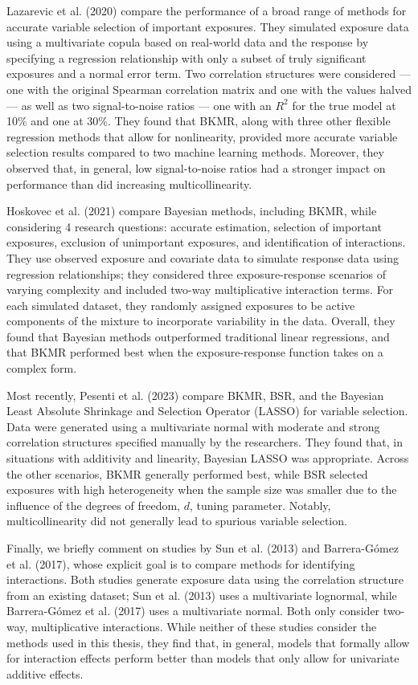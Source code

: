 \documentclass[12pt, twoside]{amherstthesis}
\begin{document}
Lazarevic et al. (2020) compare the performance of a broad range of methods for accurate variable selection of important exposures. They simulated exposure data using a multivariate copula based on real-world data and the response by specifying a regression relationship with only a subset of truly significant exposures and a normal error term. Two correlation structures were considered --- one with the original Spearman correlation matrix and one with the values halved --- as well as two signal-to-noise ratios --- one with an \(R^2\) for the true model at 10\% and one at 30\%. They found that BKMR, along with three other flexible regression methods that allow for nonlinearity, provided more accurate variable selection results compared to two machine learning methods. Moreover, they observed that, in general, low signal-to-noise ratios had a stronger impact on performance than did increasing multicollinearity.

Hoskovec et al. (2021) compare Bayesian methods, including BKMR, while considering 4 research questions: accurate estimation, selection of important exposures, exclusion of unimportant exposures, and identification of interactions. They use observed exposure and covariate data to simulate response data using regression relationships; they considered three exposure-response scenarios of varying complexity and included two-way multiplicative interaction terms. For each simulated dataset, they randomly assigned exposures to be active components of the mixture to incorporate variability in the data. Overall, they found that Bayesian methods outperformed traditional linear regressions, and that BKMR performed best when the exposure-response function takes on a complex form.

Most recently, Pesenti et al. (2023) compare BKMR, BSR, and the Bayesian Least Absolute Shrinkage and Selection Operator (LASSO) for variable selection. Data were generated using a multivariate normal with moderate and strong correlation structures specified manually by the researchers. They found that, in situations with additivity and linearity, Bayesian LASSO was appropriate. Across the other scenarios, BKMR generally performed best, while BSR selected exposures with high heterogeneity when the sample size was smaller due to the influence of the degrees of freedom, \(d\), tuning parameter. Notably, multicollinearity did not generally lead to spurious variable selection.

Finally, we briefly comment on studies by Sun et al. (2013) and Barrera-Gómez et al. (2017), whose explicit goal is to compare methods for identifying interactions. Both studies generate exposure data using the correlation structure from an existing dataset; Sun et al. (2013) uses a multivariate lognormal, while Barrera-Gómez et al. (2017) uses a multivariate normal. Both only consider two-way, multiplicative interactions. While neither of these studies consider the methods used in this thesis, they find that, in general, models that formally allow for interaction effects perform better than models that only allow for univariate additive effects.
\end{document}
